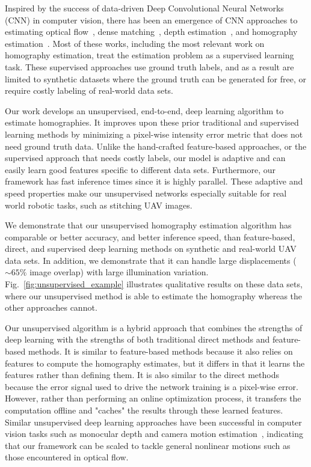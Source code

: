 \documentclass[letterpaper, 10 pt, conference]{ieeeconf}
\begin{document}
Inspired by the success of data-driven Deep Convolutional Neural Networks (CNN) in computer vision, there has been an emergence of CNN approaches to estimating optical flow~\cite{weinzaepfel2013deepflow,ilg2016flownet,fischer2015flownet}, dense matching~\cite{revaud2016deepmatching,altwaijry2016learning}, depth estimation~\cite{eigen2014depth}, and homography estimation~\cite{detone2016}. Most of these works, including the most relevant work on homography estimation, treat the estimation problem as a supervised learning task. These supervised approaches use ground truth labels, and as a result are limited to synthetic datasets where the ground truth can be generated for free, or require costly labeling of real-world data sets. 

Our work develops an unsupervised, end-to-end, deep learning algorithm to estimate homographies. It improves upon these prior traditional and supervised learning methods by minimizing a pixel-wise intensity error metric that does not need ground truth data. Unlike the hand-crafted feature-based approaches, or the supervised approach that needs costly labels, our model is adaptive and can easily learn good features specific to different data sets. Furthermore, our framework has fast inference times since it is highly parallel. These adaptive and speed properties make our unsupervised networks especially suitable for real world robotic tasks, such as stitching UAV images. 

We demonstrate that our unsupervised homography estimation algorithm has comparable or better accuracy, and better inference speed, than feature-based, direct, and supervised deep learning methods on synthetic and real-world UAV data sets. In addition, we demonstrate that it can handle large displacements ($\sim 65\%$ image overlap) with large illumination variation. Fig.~\ref{fig:unsupervised_example} illustrates qualitative results on these data sets, where our unsupervised method is able to estimate the homography whereas the other approaches cannot.

Our unsupervised algorithm is a hybrid approach that combines the strengths of deep learning with the strengths of both traditional direct methods and feature-based methods. It is similar to feature-based methods because it also relies on features to compute the homography estimates, but it differs in that it learns the features rather than defining them. It is also similar to the direct methods because the error signal used to drive the network training is a pixel-wise error. However, rather than performing an online optimization process, it transfers the computation offline and "caches" the results through these learned features. Similar unsupervised deep learning approaches have been successful in computer vision tasks such as monocular depth and camera motion estimation~\cite{zhou2017unsupervised}, indicating that our framework can be scaled to tackle general nonlinear motions such as those encountered in optical flow.
\end{document}
